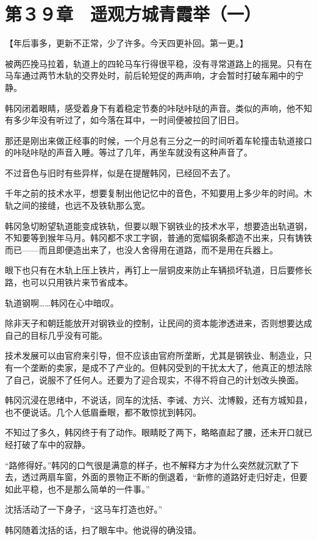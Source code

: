 \section{第３９章　遥观方城青霞举（一）}

【年后事多，更新不正常，少了许多。今天四更补回。第一更。】

被两匹挽马拉着，轨道上的四轮马车行得很平稳，没有寻常道路上的摇晃。只有在马车通过两节木轨的交界处时，前后轮短促的两声响，才会暂时打破车厢中的宁静。

韩冈闭着眼睛，感受着身下有着稳定节奏的咔哒咔哒的声音。类似的声响，他不知有多少年没有听过了，如今落在耳中，一时间便被拉回了旧日。

那还是刚出来做正经事的时候，一个月总有三分之一的时间听着车轮撞击轨道接口的咔哒咔哒的声音入睡。等过了几年，再坐车就没有这种声音了。

不过音色与旧时有些异样，似是在提醒韩冈，已经回不去了。

千年之前的技术水平，想要复制出他记忆中的音色，不知要用上多少年的时间。木轨之间的接缝，也远不及铁轨那么宽。

韩冈急切盼望轨道能变成铁轨，但要以眼下钢铁业的技术水平，想要造出轨道钢，不知要等到猴年马月。韩冈都不求工字钢，普通的宽幅钢条都造不出来，只有铸铁而已——而且即便造出来了，也没人舍得用在道路，而不是用在兵器上。

眼下也只有在木轨上压上铁片，再钉上一层铜皮来防止车辆损坏轨道，日后要修长路，也可以只用铁片来节省成本。

轨道钢啊……韩冈在心中暗叹。

除非天子和朝廷能放开对钢铁业的控制，让民间的资本能渗透进来，否则想要达成自己的目标几乎没有可能。

技术发展可以由官府来引导，但不应该由官府所垄断，尤其是钢铁业、制造业，只有一个垄断的卖家，是成不了产业的。但韩冈受到的干扰太大了，他真正的想法除了自己，说服不了任何人。还要为了迎合现实，不得不将自己的计划改头换面。

韩冈沉浸在思绪中，不说话，同车的沈括、李诫、方兴、沈博毅，还有方城知县，也不便说话。几个人低眉垂眼，都不敢惊扰到韩冈。

不知过了多久，韩冈终于有了动作。眼睛眨了两下，略略直起了腰，还未开口就已经打破了车中的寂静。

“路修得好。”韩冈的口气很是满意的样子，也不解释方才为什么突然就沉默了下去，透过两扇车窗，外面的景物正不断的倒退着，“新修的道路好走归好走，但要如此平稳，也不是那么简单的一件事。”

沈括活动了一下身子，“这马车打造也好。”

韩冈随着沈括的话，扫了眼车中。他说得的确没错。

